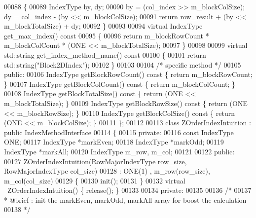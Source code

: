 \begin{DoxyCode}
00088 \textcolor{keyword}{        }\{
00089                 IndexType by, dy;
00090                 by = (col\_index >> m\_blockColSize); dy = col\_index - (by << 
      m\_blockColSize);
00091                 \textcolor{keywordflow}{return} row\_result + (by << m\_blockTotalSize) + dy;
00092         \}
00093 
00094         \textcolor{keyword}{virtual} IndexType get_max_index()\textcolor{keyword}{ const}
00095 \textcolor{keyword}{        }\{
00096                 \textcolor{keywordflow}{return} m\_blockRowCount * m\_blockColCount * (ONE << 
      m\_blockTotalSize);
00097         \}
00098 
00099         \textcolor{keyword}{virtual} std::string get_index_method_name()\textcolor{keyword}{ const}
00100 \textcolor{keyword}{        }\{
00101                 \textcolor{keywordflow}{return} std::string(\textcolor{stringliteral}{"Block2DIndex"});
00102         \}
00103 
00104 \textcolor{comment}{/* specific method */}
00105 \textcolor{keyword}{public}:
00106         IndexType getBlockRowCount()\textcolor{keyword}{ const }\{ \textcolor{keywordflow}{return} m\_blockRowCount; \}
00107         IndexType getBlockColCount()\textcolor{keyword}{ const }\{ \textcolor{keywordflow}{return} m\_blockColCount; \}
00108         IndexType getBlockTotalSize()\textcolor{keyword}{ const }\{ \textcolor{keywordflow}{return} (ONE << m\_blockTotalSize);
       \}
00109         IndexType getBlockRowSize()\textcolor{keyword}{ const }\{ \textcolor{keywordflow}{return} (ONE << m\_blockRowSize); \}
00110         IndexType getBlockColSize()\textcolor{keyword}{ const }\{ \textcolor{keywordflow}{return} (ONE << m\_blockColSize); \}
00111 \};
00112 
00113 \textcolor{keyword}{class }ZOrderIndexIntuition : \textcolor{keyword}{public} IndexMethodInterface
00114 \{
00115 \textcolor{keyword}{private}:
00116         \textcolor{keyword}{const} IndexType ONE;
00117         IndexType *markEven;
00118         IndexType *markOdd;
00119         IndexType *markAll;
00120         IndexType m\_row, m\_col;
00121 
00122 \textcolor{keyword}{public}:
00127         ZOrderIndexIntuition(RowMajorIndexType row\_size, RowMajorIndexType 
      col\_size)
00128                 : ONE(1) , m\_row(row\_size), m\_col(col\_size)
00129         \{
00130                 init();
00131         \}
00132         \textcolor{keyword}{virtual} ~ZOrderIndexIntuition() \{ release(); \}
00133 
00134 \textcolor{keyword}{private}:
00135 
00136         \textcolor{comment}{/*}
00137 \textcolor{comment}{         *      @brief : init the markEven, markOdd, markAll array for boost
       the calculation}
00138 \textcolor{comment}{         */}

\end{DoxyCode}
